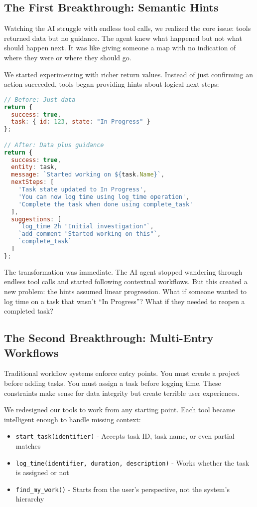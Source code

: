 \documentclass[11pt,a4paper]{article}
\begin{document}
\subsection{The First Breakthrough: Semantic Hints}

Watching the AI struggle with endless tool calls, we realized the core issue: tools returned data but no guidance. The agent knew what happened but not what should happen next. It was like giving someone a map with no indication of where they were or where they should go.

We started experimenting with richer return values. Instead of just confirming an action succeeded, tools began providing hints about logical next steps:

\begin{lstlisting}[language=JavaScript]
// Before: Just data
return {
  success: true,
  task: { id: 123, state: "In Progress" }
};

// After: Data plus guidance
return {
  success: true,
  entity: task,
  message: `Started working on ${task.Name}`,
  nextSteps: [
    'Task state updated to In Progress',
    'You can now log time using log_time operation',
    'Complete the task when done using complete_task'
  ],
  suggestions: [
    `log_time 2h "Initial investigation"`,
    `add_comment "Started working on this"`,
    `complete_task`
  ]
};
\end{lstlisting}

The transformation was immediate. The AI agent stopped wandering through endless tool calls and started following contextual workflows. But this created a new problem: the hints assumed linear progression. What if someone wanted to log time on a task that wasn't ``In Progress''? What if they needed to reopen a completed task?

\subsection{The Second Breakthrough: Multi-Entry Workflows}

Traditional workflow systems enforce entry points. You must create a project before adding tasks. You must assign a task before logging time. These constraints make sense for data integrity but create terrible user experiences.

We redesigned our tools to work from any starting point. Each tool became intelligent enough to handle missing context:

\begin{itemize}
\item \texttt{start\_task(identifier)} - Accepts task ID, task name, or even partial matches
\item \texttt{log\_time(identifier, duration, description)} - Works whether the task is assigned or not
\item \texttt{find\_my\_work()} - Starts from the user's perspective, not the system's hierarchy
\end{itemize}
\end{document}
